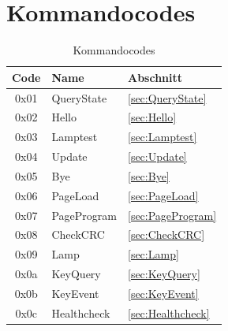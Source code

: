 \documentclass[10pt,a4paper]{article}
\begin{document}
\section{Kommandocodes}
\begin{table}[H]
\centering
\begin{tabular}{c|l|l}
\textbf{Code} & \textbf{Name} & \textbf{Abschnitt} \\ \hline
0x01 & QueryState & \ref{sec:QueryState}\\
0x02 & Hello & \ref{sec:Hello}\\
0x03 & Lamptest & \ref{sec:Lamptest}\\
0x04 & Update & \ref{sec:Update}\\
0x05 & Bye & \ref{sec:Bye}\\
0x06 & PageLoad & \ref{sec:PageLoad}\\
0x07 & PageProgram & \ref{sec:PageProgram}\\
0x08 & CheckCRC & \ref{sec:CheckCRC}\\
0x09 & Lamp & \ref{sec:Lamp}\\
0x0a & KeyQuery & \ref{sec:KeyQuery}\\
0x0b & KeyEvent & \ref{sec:KeyEvent}\\
0x0c & Healthcheck & \ref{sec:Healthcheck}
\end{tabular}
\caption{Kommandocodes}
\end{table}



\nocite{*}

\printbibliography
\end{document}
